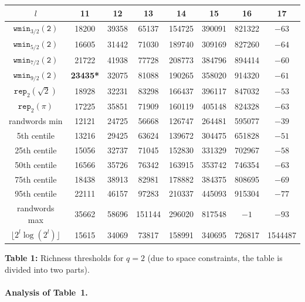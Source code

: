 \documentclass{template_arxiv}
\numberwithin{equation}{section}
\newcommand{\wmin}{\mathtt{wmin}}
\newcommand{\rep}{\mathtt{rep}}
\begin{document}
\begin{center}
{		\vspace{0.2cm}
		\begin{tabular}{|c||c|c|c|c|c|c|c|}
			\hline
			$l$&  11 & 12 & 13 & 14 & 15 & 16 & 17 \\
			\hline \hline
			$\wmin_{3/2}(\mathtt{2})$ &18200& 39358 & 65137 & 154725 & 390091 & 821322 & $-63$ \\
			\hline
			$\wmin_{5/2}(\mathtt{2})$ &16605 & 31442 & 71030 & 189740 & 309169 & 827260 & $-64$ \\
			\hline
			$\wmin_{7/2}(\mathtt{2})$ & 21722& 41938 & 77728 & 208773 & 384796 & 894414 & $-60$ \\
			\hline
			$\wmin_{9/2}(\mathtt{2})$ & \textbf{23435*} &32075 & 81088 & 190265 & 358020 & 914320 & $-61$ \\
			\hline
			$\rep_2(\sqrt{2})$ & 18928 & 32231 & 83298 & 166437 & 396117 & 847032 & $-53$ \\
			\hline
			$\rep_2(\pi)$ & 17225 & 35851 & 71909 & 160119 & 405148 & 824328 & $-63$ \\
			\hline
			randwords min & 12121& 24725 & 56668 & 126747 & 264481 & 595077 & $-39$\\
			\hline
			5th centile & 13216& 29425 & 63624 & 139672 & 304475 & 651828 & $-51$\\
			\hline
			25th centile & 15056& 32737 & 71045 & 152830 & 331329 & 702967 & $-58$\\
			\hline
			50th centile & 16566& 35726 & 76342 & 163915 & 353742 & 746354 & $-63$\\
			\hline
			75th centile & 18438 & 38913 & 82981 & 178882 & 384375 & 808695 & $-69$\\
			\hline
			95th centile & 22111& 46157 & 97283 & 210337 & 445093 & 915304 & $-77$\\
			\hline
			randwords max & 35662& 58696 & 151144 & 296020 & 817548 & $-1$ & $-93$\\
			\hline
			$\lfloor 2^l\log(2^l)\rfloor$ &15615 & 34069 & 73817 & 158991 & 340695 & 726817 & 1544487\\
			\hline
	\end{tabular}}
	\normalsize
	
	\medskip
	\noindent\textbf{Table 1:} Richness thresholds for $q=2$ (due to space constraints, the table is divided into two parts).
\end{center}


\paragraph{Analysis of Table~1.}
\end{document}
